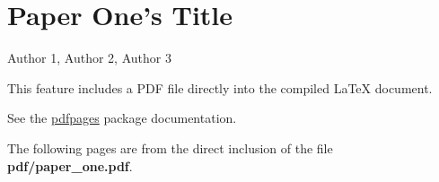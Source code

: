 
\newcommand{\PaperTitleOne}{Paper One's Title}

\section{\PaperTitleOne}

\begin{flushright}
Author 1, Author 2, Author 3
\end{flushright}

This feature includes a PDF file directly into the compiled LaTeX document.

See the \href{http://www.ctan.org/tex-archive/macros/latex/contrib/pdfpages/}{pdfpages}
package documentation.

The following pages are from the direct inclusion of the file
\textbf{pdf/paper\_one.pdf}.


